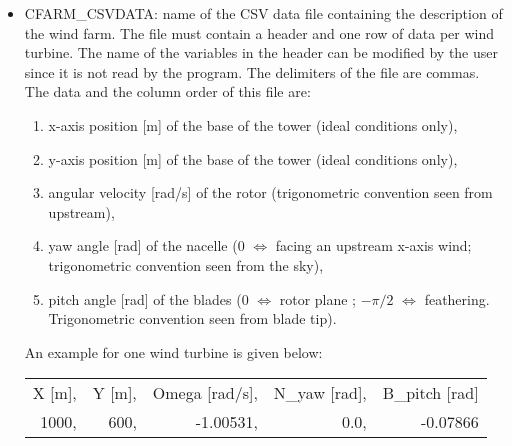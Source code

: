 \begin{itemize}

\item CFARM\_CSVDATA: name of the CSV data file containing the description of the wind farm. The file must contain a header and one row of data per wind turbine. The name of the variables in the header can be modified by the user since it is not read by the program. The delimiters of the file are commas. The data and the column order of this file are: 
\begin{enumerate}
\item x-axis position [m] of the base of the tower (ideal conditions only),
\item y-axis position [m] of the base of the tower (ideal conditions only),
\item angular velocity [rad/s] of the rotor (trigonometric convention seen from upstream),
\item yaw angle [rad] of the nacelle ($0$ $\Leftrightarrow$ facing an upstream x-axis wind; trigonometric convention seen from the sky),
\item pitch angle [rad] of the blades ($0$ $\Leftrightarrow$ rotor plane ; $-\pi/2$ $\Leftrightarrow$ feathering. Trigonometric convention seen from blade tip).
\end{enumerate}
An example for one wind turbine is given below:
\begin{center}
\begin{tabular} {|rrrrr|}
\hline
X [m],& Y [m],& Omega [rad/s],& N\_yaw [rad],& B\_pitch [rad]\\
1000,& 600,& -1.00531,& 0.0,& -0.07866\\
\hline
\end{tabular}
\end{center}


\end{itemize}
